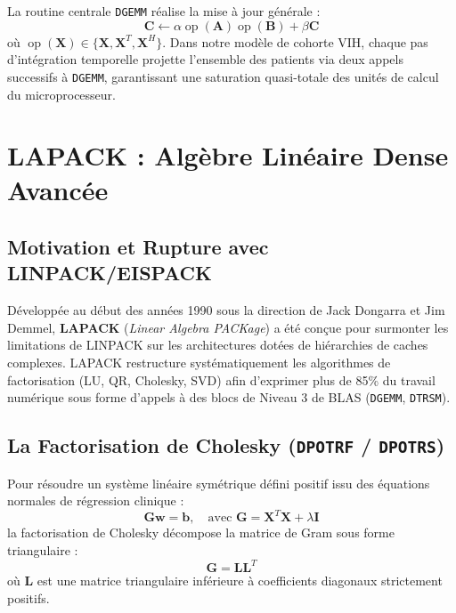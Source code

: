 \documentclass[11pt,a4paper]{report}
\theoremstyle{plain}
\theoremstyle{definition}
\theoremstyle{remark}
\begin{document}
La routine centrale \texttt{DGEMM} réalise la mise à jour générale :
\begin{equation}
\mathbf{C} \leftarrow \alpha \operatorname{op}(\mathbf{A}) \operatorname{op}(\mathbf{B}) + \beta \mathbf{C}
\end{equation}
où $\operatorname{op}(\mathbf{X}) \in \{\mathbf{X}, \mathbf{X}^T, \mathbf{X}^H\}$. Dans notre modèle de cohorte VIH, chaque pas d'intégration temporelle projette l'ensemble des patients via deux appels successifs à \texttt{DGEMM}, garantissant une saturation quasi-totale des unités de calcul du microprocesseur.

\chapter{LAPACK : Algèbre Linéaire Dense Avancée}

\section{Motivation et Rupture avec LINPACK/EISPACK}
Développée au début des années 1990 sous la direction de Jack Dongarra et Jim Demmel, \textbf{LAPACK} (\textit{Linear Algebra PACKage}) a été conçue pour surmonter les limitations de LINPACK sur les architectures dotées de hiérarchies de caches complexes. LAPACK restructure systématiquement les algorithmes de factorisation (LU, QR, Cholesky, SVD) afin d'exprimer plus de 85\% du travail numérique sous forme d'appels à des blocs de Niveau 3 de BLAS (\texttt{DGEMM}, \texttt{DTRSM}).

\section{La Factorisation de Cholesky (\texttt{DPOTRF} / \texttt{DPOTRS})}
Pour résoudre un système linéaire symétrique défini positif issu des équations normales de régression clinique :
\begin{equation}
\mathbf{G} \mathbf{w} = \mathbf{b}, \quad \text{avec } \mathbf{G} = \mathbf{X}^T \mathbf{X} + \lambda \mathbf{I}
\end{equation}
la factorisation de Cholesky décompose la matrice de Gram sous forme triangulaire :
\begin{equation}
\mathbf{G} = \mathbf{L} \mathbf{L}^T
\end{equation}
où $\mathbf{L}$ est une matrice triangulaire inférieure à coefficients diagonaux strictement positifs.
\end{document}
